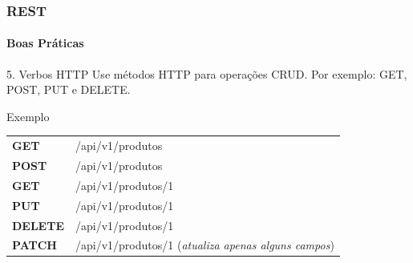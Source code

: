 \documentclass[
	9pt, %
	t, %
]{beamer}
\newcommand{\yellowbox}[1]{\colorbox{yellow!75}{#1}}
\begin{document}
\begin{frame}
	\frametitle{REST}
	\framesubtitle{Boas Práticas}

	\begin{block}{5. Verbos HTTP}
		Use métodos HTTP para operações CRUD. Por exemplo: \yellowbox{GET, POST, PUT e DELETE}. 
	\end{block}

	\begin{exampleblock}{Exemplo}
		\begin{tabular}{@{}ll@{}}
			\yellowbox{\textbf{GET}}    &  /api/v1/produtos \\
			\yellowbox{\textbf{POST}}   &  /api/v1/produtos \\
			\yellowbox{\textbf{GET}}    &  /api/v1/produtos/1 \\
			\yellowbox{\textbf{PUT}}    &  /api/v1/produtos/1 \\
			\yellowbox{\textbf{DELETE}} &  /api/v1/produtos/1 \\
			\yellowbox{\textbf{PATCH}}  &  /api/v1/produtos/1 (\textit{atualiza apenas alguns campos})
		\end{tabular}
	\end{exampleblock}

\end{frame}
\end{document}
